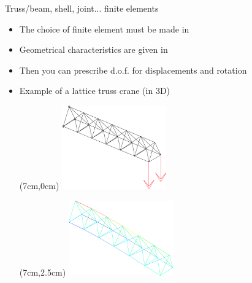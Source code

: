 \begin{frame}{
                 {Truss/beam, shell, joint... finite elements}}
  \begin{itemize}
    \item {}
             {The choice of finite element must be made in }
    
    \item {}
             {Geometrical characteristics are given in }
    
    \item {}
             {Then you can prescribe d.o.f. for displacements and rotation}
    
  \end{itemize}
\end{frame}

\begin{frame}{}
  \begin{itemize}
    \item {}
             {Example of a lattice truss crane (in 3D)}
    \begin{textblock*}{6cm}(7cm,0cm)
      \includegraphics[width=4.5cm]{images/treillis_grue_3d.1}
    \end{textblock*}
    \begin{textblock*}{6cm}(7cm,2.5cm)
      \includegraphics[width=4.5cm]{images/treillis_grue_3d.2}
    \end{textblock*}
    
  \end{itemize}
  \vspace{1cm}
\end{frame}

